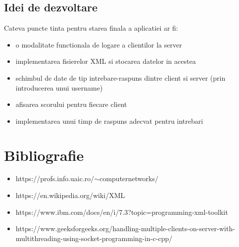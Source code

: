 \documentclass[runningheads]{llncs}
\begin{document}
\subsection{Idei de dezvoltare}
Cateva puncte tinta pentru starea finala a aplicatiei ar fi:
\begin{itemize}
\item o modalitate functionala de logare a clientilor la server
\item implementarea fisierelor XML si stocarea datelor in acestea
\item schimbul de date de tip intrebare-raspuns dintre client si server (prin introducerea unui username)
\item afisarea scorului pentru fiecare client
\item implementarea unui timp de raspuns adecvat pentru intrebari
\end{itemize}
\newpage

\section{Bibliografie}
\begin{itemize}
\item https://profs.info.uaic.ro/$\sim$computernetworks/
\item https://en.wikipedia.org/wiki/XML
\item https://www.ibm.com/docs/en/i/7.3?topic=programming-xml-toolkit
\item https://www.geeksforgeeks.org/handling-multiple-clients-on-server-with-multithreading-using-socket-programming-in-c-cpp/
\end{itemize}
\end{document}
